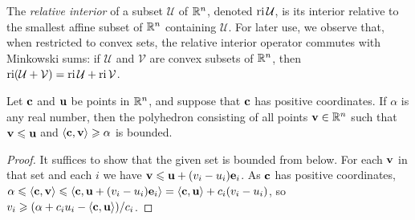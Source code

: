 \documentclass[11pt]{amsart}
\begin{document}
The \emph{relative interior} of a subset $\mathcal{U}$ of $\mathbb{R}^n$, denoted $\operatorname{ri} \mathcal{U}$, is its interior relative to the smallest affine subset of $\mathbb{R}^n$ containing $\mathcal{U}$.
For later use, we observe that, when restricted to convex sets, the relative interior operator commutes with Minkowski sums: if $\mathcal{U}$ and $\mathcal{V}$ are convex subsets of $\mathbb{R}^n$, then $\operatorname{ri}(\mathcal{U}+\mathcal{V})=\operatorname{ri} \mathcal{U}+\operatorname{ri} \mathcal{V}$.

\begin{proposition}  
   \label{bounded polytope: P}
   Let $\mathbf{c}$ and $\mathbf{u}$ be points in $\mathbb{R}^n$, and suppose that $\mathbf{c}$ has positive coordinates.
   If $\alpha$ is any real number, then the polyhedron consisting of all points $\mathbf{v} \in \mathbb{R}^n$ such that  $\mathbf{v} \leqslant \mathbf{u}$ and $\langle \mathbf{c}, \mathbf{v} \rangle \geqslant \alpha$ is bounded.
\end{proposition}

\begin{proof}
   It suffices to show that the given set is bounded from below.
   For each $\mathbf{v}$ in that set and each $i$ we have $\mathbf{v}\leqslant \mathbf{u} + (v_i - u_i)\mathbf{e}_i$.
   As $\mathbf{c}$ has positive coordinates, $\alpha\leqslant \langle \mathbf{c}, \mathbf{v} \rangle\leqslant \langle \mathbf{c}, \mathbf{u} + (v_i -u_i)\mathbf{e}_i \rangle = 
  \langle \mathbf{c}, \mathbf{u} \rangle + c_i(v_i - u_i)$, so $v_i \geqslant (\alpha + c_iu_i - \langle \mathbf{c}, \mathbf{u} \rangle)/c_i$.
\end{proof}
\end{document}

